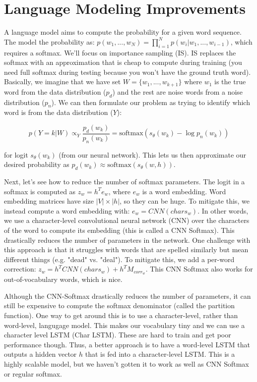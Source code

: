 \documentclass[a4paper]{article}
\begin{document}
\section{Language Modeling Improvements}
A language model aims to compute the probability for a given word sequence.
The model the probability as: $p(w_1, ..., w_N) = \prod_{i=1}^{N}{
p(w_i | w_1, ..., w_{i-1})}$, which requires a softmax. We'll focus on
importance sampling (IS). IS replaces the softmax with an approximation that
is cheap to compute during training (you need full softmax during testing
because you won't have the ground truth word). Basically, we imagine that
we have set $W = \{w_1, ..., w_{k+1}\}$ where $w_1$ is the true word from
the data distribution ($p_d$)
and the rest are noise words from a noise distribution ($p_n$).
We can then formulate our problem as trying to identify which word is from
the data distribution ($Y$):

$$
p(Y=k|W) \propto_{Y} \frac{p_d(w_k)}{p_n(w_k)} = \text{softmax}(s_\theta(w_k)
- \log{p_n(w_k)})
$$

for logit $s_\theta(w_k)$ (from our neural network). This lets us then
approximate our desired probability as
$p_d(w_k) \approx \text{softmax}(s_\theta(w, h))$.

Next, let's see how to reduce the number of softmax parameters. The logit
in a softmax is computed as $z_w = h^T e_w$, where $e_w$ is a word embedding.
Word embedding matrices have size $|V| \times |h|$, so they can be huge. To
mitigate this, we instead compute a word embedding with: $e_w = CNN(chars_w)$.
In other words, we use a character-level convolutional neural network (CNN)
over the characters of the word to compute its embedding (this is called
a CNN Softmax). This drastically reduces the number of parameters in the
network. One challenge with this approach is that it struggles with words
that are spelled similarly but mean different things (e.g. "dead" vs. "deal").
To mitigate this, we add a per-word correction:
$z_w = h^T CNN(chars_w) + h^T M_{corr_w}$. This CNN Softmax also works for
out-of-vocabulary words, which is nice.

Although the CNN-Softmax drastically reduces the number of parameters,
it can still be expensive to compute the softmax denominator (called the
partition function). One way to get around this is to use a character-level,
rather than word-level, langugage model. This makes our vocabulary tiny
and we can use a character level LSTM (Char LSTM). These are hard to train
and get poor performance though. Thus, a better approach is to have a
word-level LSTM that outputs a hidden vector $h$ that is fed into a
character-level LSTM. This is a highly scalable model, but we haven't gotten
it to work as well as CNN Softmax or regular softmax.
\end{document}
